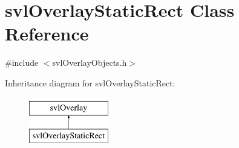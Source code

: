 \hypertarget{classsvl_overlay_static_rect}{\section{svl\-Overlay\-Static\-Rect Class Reference}
\label{classsvl_overlay_static_rect}
}


{\ttfamily \#include $<$svl\-Overlay\-Objects.\-h$>$}

Inheritance diagram for svl\-Overlay\-Static\-Rect\-:\begin{figure}[H]
\begin{center}
\leavevmode
\includegraphics[height=2.000000cm]{d9/d51/classsvl_overlay_static_rect}
\end{center}
\end{figure}
